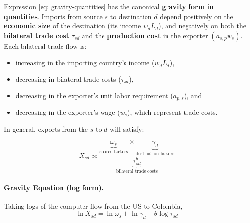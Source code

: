 \documentclass[11pt,letterpaper]{article}
\begin{document}
Expression \eqref{eq: gravity-quantities} has the canonical \textbf{gravity form in quantities}.  Imports from source $s$ to destination $d$ depend positively on the \textbf{economic size} of the destination (its income $w_d L_d$),  and negatively on both the \textbf{bilateral trade cost} $\tau_{sd}$  and the \textbf{production cost} in the exporter $(a_{s,p} w_s)$. Each bilateral trade flow is:
\begin{itemize}[noitemsep]
    \item increasing in the importing country’s income ($w_d L_d$),
    \item decreasing in bilateral trade costs ($\tau_{sd}$),
    \item decreasing in the exporter’s unit labor requirement ($a_{p,s}$), and
    \item decreasing in the exporter’s wage ($w_s$), which represent trade costs.
\end{itemize}



In general, exports from the $s$ to $d$ will satisfy:  

\[
X_{sd} \propto \frac{\underbrace{\omega_{s}}_{\text{source factors}} \times \underbrace{\gamma_{d}}_{\text{destination factors}}}{\underbrace{\tau_{sd}^{\theta}}_{\text{bilateral trade costs}}} 
\]


\paragraph{Gravity Equation (log form).}
Taking logs of the computer flow from the US to Colombia,
\[
\ln X_{sd}
   = \ln \omega_s + \ln \gamma_d - \theta\log  \tau_{sd}
\]
\end{document}
